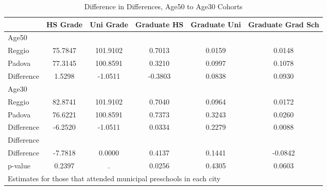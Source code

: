 \begin{table}[htbp]\centering
\caption{Difference in Differences, Age50 to Age30 Cohorts}
\begin{tabular}{l*{5}{c}}
\hline\hline
            &    HS Grade&   Uni Grade& Graduate HS&Graduate Uni&Graduate Grad Sch\\
\hline
Age50       &            &            &            &            &            \\
Reggio      &     75.7847&    101.9102&      0.7013&      0.0159&      0.0148\\
Padova      &     77.3145&    100.8591&      0.3210&      0.0997&      0.1078\\
Difference  &      1.5298&     -1.0511&     -0.3803&      0.0838&      0.0930\\
\hline
Age30       &            &            &            &            &            \\
Reggio      &     82.8741&    101.9102&      0.7040&      0.0964&      0.0172\\
Padova      &     76.6221&    100.8591&      0.7373&      0.3243&      0.0260\\
Difference  &     -6.2520&     -1.0511&      0.0334&      0.2279&      0.0088\\
\hline
Difference  &            &            &            &            &            \\
Difference  &     -7.7818&      0.0000&      0.4137&      0.1441&     -0.0842\\
p-value     &      0.2397&           .&      0.0256&      0.4305&      0.0603\\
\hline\hline
\multicolumn{6}{l}{\footnotesize Estimates for those that attended municipal preschools in each city}\\
\end{tabular}
\end{table}
